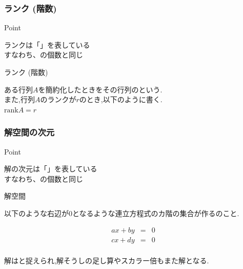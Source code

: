 \documentclass[a4paper]{jsarticle}
\begin{document}
\subsubsection{ランク (階数)}
\begin{itembox}[l]{Point}
    \begin{center}
        ランクは「」を表している\\
        すなわち、の個数と同じ
    \end{center}
\end{itembox}
\begin{itembox}[l]{ランク (階数)}
    \begin{center}
        ある行列$A$を簡約化したときをその行列のという.\\
        また,行列$A$のランクが$r$のとき,以下のように書く.\\
        $\mathrm{rank}A=r$\\
    \end{center}
\end{itembox}
\subsubsection{解空間の次元}
\begin{itembox}[l]{Point}
    \begin{center}
        解の次元は「」を表している\\
        すなわち、の個数と同じ
    \end{center}
\end{itembox}
\begin{itembox}[l]{解空間}
    \begin{center}
        以下のような右辺が$0$となるような連立方程式のカ階の集合が作るのこと.
    \end{center}
    \begin{eqnarray*}
        ax+by&=&0\\
        cx+dy&=&0\\
    \end{eqnarray*}
    \begin{center}
        解はと捉えられ,解そうしの足し算やスカラー倍もまた解となる.
    \end{center}
\end{itembox}
\end{document}

